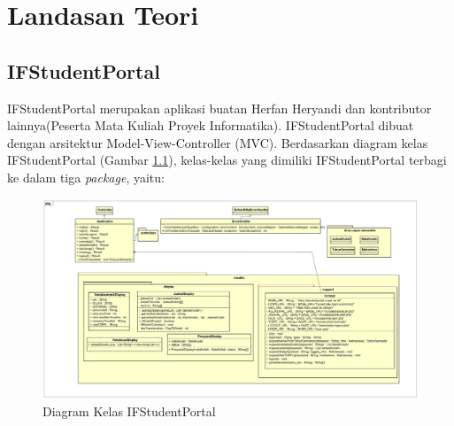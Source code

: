 \chapter{Landasan Teori}
\label{chap:teori}

\section{IFStudentPortal}
\label{sec:ifstudentportal} 
 
IFStudentPortal \cite{ifstudentportal} merupakan aplikasi buatan Herfan Heryandi dan kontributor lainnya(Peserta Mata Kuliah Proyek Informatika). IFStudentPortal dibuat dengan arsitektur Model-View-Controller (MVC). Berdasarkan diagram kelas IFStudentPortal (Gambar \ref{fig:2_ifstudentportal_class}), kelas-kelas yang dimiliki IFStudentPortal terbagi ke dalam tiga \textit{package}, yaitu:

\begin{figure}[H]
\centering
\includegraphics[scale=0.135]{Gambar/class-diagram-ifstudentportal}
\caption{Diagram Kelas IFStudentPortal}
\label{fig:2_ifstudentportal_class}
\end{figure}

